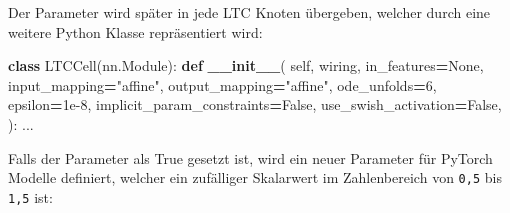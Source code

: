 \documentclass[11pt,ngerman,a4paper,]{article}
\newenvironment{Shaded}{\begin{snugshade}}{\end{snugshade}}
\newcommand{\DecValTok}[1]{\textcolor[rgb]{0.00,0.00,0.81}{#1}}
\newcommand{\FloatTok}[1]{\textcolor[rgb]{0.00,0.00,0.81}{#1}}
\newcommand{\FunctionTok}[1]{\textcolor[rgb]{0.13,0.29,0.53}{\textbf{#1}}}
\newcommand{\KeywordTok}[1]{\textcolor[rgb]{0.13,0.29,0.53}{\textbf{#1}}}
\newcommand{\NormalTok}[1]{#1}
\newcommand{\OperatorTok}[1]{\textcolor[rgb]{0.81,0.36,0.00}{\textbf{#1}}}
\newcommand{\StringTok}[1]{\textcolor[rgb]{0.31,0.60,0.02}{#1}}
\newcommand{\VariableTok}[1]{\textcolor[rgb]{0.00,0.00,0.00}{#1}}
\begin{document}
Der Parameter wird später in jede LTC Knoten übergeben, welcher durch eine weitere Python Klasse repräsentiert wird:

\singlespacing

\begin{Shaded}
\begin{Highlighting}[numbers=left,,]
\KeywordTok{class}\NormalTok{ LTCCell(nn.Module):}
    \KeywordTok{def} \FunctionTok{\_\_init\_\_}\NormalTok{(}
        \VariableTok{self}\NormalTok{,}
\NormalTok{        wiring,}
\NormalTok{        in\_features}\OperatorTok{=}\VariableTok{None}\NormalTok{,}
\NormalTok{        input\_mapping}\OperatorTok{=}\StringTok{"affine"}\NormalTok{,}
\NormalTok{        output\_mapping}\OperatorTok{=}\StringTok{"affine"}\NormalTok{,}
\NormalTok{        ode\_unfolds}\OperatorTok{=}\DecValTok{6}\NormalTok{,}
\NormalTok{        epsilon}\OperatorTok{=}\FloatTok{1e{-}8}\NormalTok{,}
\NormalTok{        implicit\_param\_constraints}\OperatorTok{=}\VariableTok{False}\NormalTok{,}
\NormalTok{        use\_swish\_activation}\OperatorTok{=}\VariableTok{False}\NormalTok{,}
\NormalTok{    ):}
\NormalTok{      ...}
\end{Highlighting}
\end{Shaded}

Falls der Parameter als True gesetzt ist, wird ein neuer Parameter für PyTorch Modelle definiert, welcher ein zufälliger Skalarwert im Zahlenbereich von \texttt{0,5} bis \texttt{1,5} ist:

\singlespacing
\end{document}
